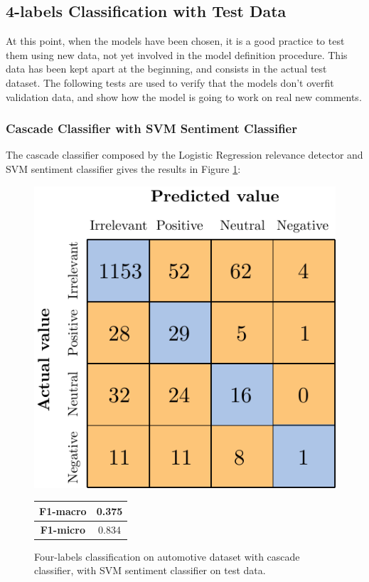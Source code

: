 \subsection{4-labels Classification with Test Data}

At this point, when the models have been chosen, it is a good practice to test them using new data, not yet involved in the model definition procedure. This data has been kept apart at the beginning, and consists in the actual test dataset. The following tests are used to verify that the models don't overfit validation data, and show how the model is going to work on real new comments.


\subsubsection{Cascade Classifier with SVM Sentiment Classifier}

The cascade classifier composed by the Logistic Regression relevance detector and SVM sentiment classifier gives the results in Figure \ref{fig:ita_cascade_svm_tst}:

\begin{figure}[H]
	\begin{minipage}[b]{0.6\linewidth}
		\centering
		\includegraphics[scale=1]{figures/conf_matrices/ita_cascade_svm/ita_cascade_svm_tst.pdf}
	\end{minipage}
	\begin{minipage}[b]{0.3\linewidth}
		\begin{tabular}[b]{ | c | c | } 
			\hline
			\textbf{F1-macro} & 0.375 \\
			\hline
			\textbf{F1-micro} & 0.834 \\ 
			\hline
		\end{tabular}
	\end{minipage}
	\caption{Four-labels classification on automotive dataset with cascade classifier, with SVM sentiment classifier on test data.}
	\label{fig:ita_cascade_svm_tst}
\end{figure}


